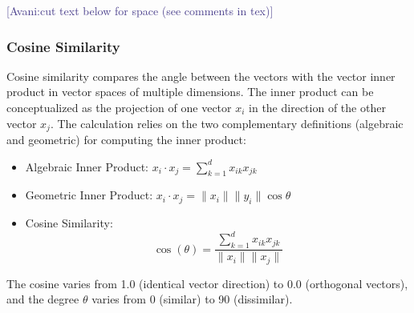 \documentclass[conference]{IEEEtran}
\newcommand{\avani}[1]          {\textcolor{darkslateblue}{[Avani:#1]}}
\begin{document}
{\avani{cut text below for space (see comments in tex)}
%
%
}%

\subsubsection{Cosine Similarity}
\label{sec:cos_sim}
Cosine similarity compares the angle between the vectors with the vector inner product in vector spaces of multiple dimensions. The inner product can be conceptualized
as the projection of one vector $x_{i}$ in the direction of the other vector $x_{j}$. The calculation relies on the two complementary definitions (algebraic and geometric) for computing the inner product:
\begin{itemize}
\item 
Algebraic Inner Product:
$x_{i}\cdot x_{j}=\sum_{k=1}^{d} x_{ik} x_{jk}$
\item
Geometric Inner Product:
$x_{i}\cdot x_{j}=\|x_{i}\|\|y_{i}\|\cos\theta$
\item
Cosine Similarity:
\begin{equation}
\cos(\theta)=\frac{\sum_{k=1}^{d} x_{ik} x_{jk}}{\|x_{i}\|\|x_{j}\|}
\end{equation}
\end{itemize} 
The cosine varies from 1.0 (identical vector direction) to 0.0 (orthogonal vectors), and the degree $\theta$ varies from 0 (similar) to 90 (dissimilar).%
\end{document}
